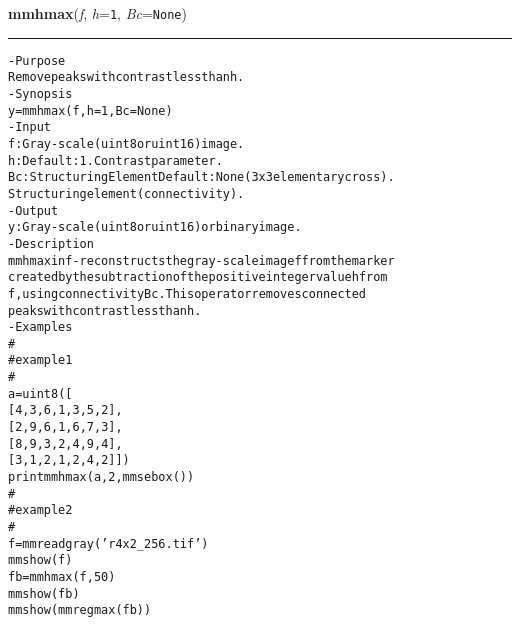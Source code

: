     \begin{boxedminipage}{\textwidth}

    \raggedright \textbf{mmhmax}(\textit{f}, \textit{h}=\texttt{1\-}, \textit{Bc}=\texttt{N\-o\-n\-e\-})

    \vspace{-1.5ex}

    \rule{\textwidth}{0.5\fboxrule}
\begin{alltt}
- Purpose
    Remove peaks with contrast less than h.
- Synopsis
    y = mmhmax(f, h=1, Bc=None)
- Input
    f:  Gray-scale (uint8 or uint16) image.
    h:  Default: 1. Contrast parameter.
    Bc: Structuring Element Default: None (3x3 elementary cross).
        Structuring element ( connectivity).
- Output
    y: Gray-scale (uint8 or uint16) or binary image.
- Description
    mmhmax inf-reconstructs the gray-scale image f from the marker
    created by the subtraction of the positive integer value h from
    f , using connectivity Bc . This operator removes connected
    peaks with contrast less than h .
- Examples
    \#
    \#   example 1
    \#
    a = uint8([
        [4,   3,   6,  1,  3,  5,  2],
        [2,   9,   6,  1,  6,  7,  3],
        [8,   9,   3,  2,  4,  9,  4],
        [3,   1,   2,  1,  2,  4,  2]])
    print mmhmax(a,2,mmsebox())
    \#
    \#   example 2
    \#
    f = mmreadgray('r4x2\_256.tif')
    mmshow(f)
    fb = mmhmax(f,50)
    mmshow(fb)
    mmshow(mmregmax(fb))\end{alltt}

    \vspace{1ex}

    \end{boxedminipage}

    \label{multireg:num_pymorph:mmhmin}
    \vspace{0.5ex}

